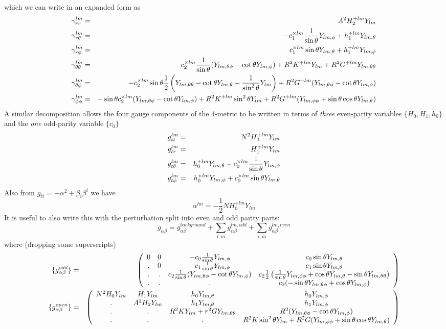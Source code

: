 %
which we can write in an expanded form as 
%
\begin{eqnarray}
\gamma_{rr}^{lm} 
  & = & A^2 H_2^{+lm} Y_{lm} 
\\
\gamma_{r\theta}^{lm} 
  & = & - c_1^{\times lm} \frac{1}{\sin\theta} Y_{lm,\phi}+h_1^{+lm}Y_{lm,\theta} 
\\
\gamma_{r\phi}^{lm} 
  & = & c_1^{\times lm} \sin\theta Y_{lm,\theta}+ h_1^{+lm}Y_{lm,\phi} 
\\
\gamma_{\theta\theta}^{lm} 
  & = & c_2^{\times lm}\frac{1}{\sin\theta}(Y_{lm,\theta\phi}-\cot\theta Y_{lm,\phi}) 
      + R^2 K^{+lm}Y_{lm} + R^2 G^{+lm}    Y_{lm,\theta\theta} 
\\
\gamma_{\theta\phi}^{lm} 
  & = & -c_2^{\times lm}\sin\theta \frac{1}{2} 
  \left(
  Y_{lm,\theta\theta}-\cot\theta Y_{lm,\theta}-\frac{1}{\sin^2\theta}Y_{lm} \right)
  + R^2 G^{+lm}(Y_{lm,\theta\phi}-\cot\theta Y_{lm,\phi})
\\
\gamma_{\phi\phi}^{lm}
  & = &  -\sin\theta c_2^{\times lm} (Y_{lm,\theta\phi} - \cot\theta Y_{lm,\phi})
        +R^2 K^{+lm}\sin^2\theta Y_{lm}
        +R^2 G^{+lm} (Y_{lm,\phi\phi}+\sin\theta\cos\theta Y_{lm,\theta})
\end{eqnarray}
%
A similar decomposition allows the four gauge components of the
4-metric to be written in terms of {\it three} even-parity variables
$\{H_0,H_1,h_0\}$ and the {\it one} odd-parity variable $\{c_0\}$
%
\begin{eqnarray}
  g_{tt}^{lm} & = & N^2 H_0^{+lm} Y_{lm} 
\\
  g_{tr}^{lm} & = & H_1^{+lm} Y_{lm}
\\
  g_{t\theta}^{lm} & = & h_0^{+lm} Y_{lm,\theta} - c_0^{\times lm}\frac{1}{\sin\theta}Y_{lm,\phi}
\\
  g_{t\phi}^{lm} & = & h_0^{+lm} Y_{lm,\phi} + c_0^{\times lm} \sin\theta Y_{lm,\theta}
\end{eqnarray} 
%        
Also from $g_{tt}=-\alpha^2+\beta_i\beta^i$ we have
%
\begin{equation}
  \alpha^{lm} = -\frac{1}{2}NH_0^{+lm}Y_{lm}
\end{equation}
%
It is useful to also write this with the perturbation split into even and
odd parity parts:
$$
g_{\alpha\beta} = {g}^{background}_{\alpha\beta} +
   \sum_{l,m} g^{lm,odd}_{\alpha\beta}
+\sum_{l,m} g^{lm,even}_{\alpha\beta}
$$
where (dropping some superscripts)
\begin{eqnarray*}
\{g_{\alpha\beta}^{odd}\}
&=&
\left( 
\begin{array}{cccc}
0 & 0 &  - c_0\frac{1}{\sin\theta}Y_{lm,\phi}
    & c_0 \sin\theta Y_{lm,\theta}
\\
. & 0 & - c_1\frac{1}{\sin\theta} Y_{lm,\phi}
  & c_1 \sin\theta Y_{lm,\theta}
\\
. & . & c_2\frac{1}{\sin\theta}(Y_{lm,\theta\phi}-\cot\theta Y_{lm,\phi})  
  & c_2\frac{1}{2} \left(\frac{1}{\sin\theta}
          Y_{lm,\phi\phi}+\cos\theta Y_{lm,\theta}-\sin\theta Y_{lm,\theta\theta}\right)
\\
.&.&.&c_2 (-\sin\theta Y_{lm,\theta\phi}+\cos\theta Y_{lm,\phi})
\end{array}
\right)
\\
\{g_{\alpha\beta}^{even}\}
&=&
\left( 
\begin{array}{cccc}
N^2 H_0Y_{lm} & H_1Y_{lm}       & h_0Y_{lm,\theta}          & h_0 Y_{lm,\phi}             \\ 
.       & A^2H_2Y_{lm} & h_1Y_{lm,\theta}          & h_1 Y_{lm,\phi}             \\
.       & .           & R^2KY_{lm}+r^2GY_{lm,\theta\theta} & R^2(Y_{lm,\theta\phi}-\cot\theta Y_{lm,\phi}) \\
.       & .           & .                & R^2 K\sin^2\theta Y_{lm}+R^2G(Y_{lm,\phi\phi}+\sin\theta\cos\theta Y_{lm,\theta})
\end{array}
\right)
\end{eqnarray*}

